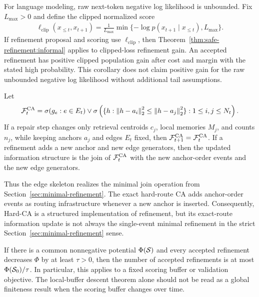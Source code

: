 \begin{corollary}
\label{cor:lm-clipped-refinement:informal}
For language modeling, raw next-token negative log likelihood is unbounded. Fix $L_{\max}>0$ and define the clipped normalized score
\begin{align*}
\ell_{\mathrm{clip}}(x_{\le t},x_{t+1})
=
\frac{1}{L_{\max}}
\min\{-\log p(x_{t+1}\mid x_{\le t}),L_{\max}\}.
\end{align*}
If refinement proposal and scoring use $\ell_{\mathrm{clip}}$, then Theorem~\ref{thm:safe-refinement:informal} applies to clipped-loss refinement gain. An accepted refinement has positive clipped population gain after cost and margin with the stated high probability. This corollary does not claim positive gain for the raw unbounded negative log likelihood without additional tail assumptions.
\end{corollary}

\begin{theorem}
\label{thm:anchor-stable:informal}
Let
\begin{align*}
\mathcal{F}_t^{\mathrm{CA}}
=
\sigma(g_e:e\in E_t)
\vee
\sigma\left(\{h:\left\lVert h-a_i\right\rVert_2^2\le \left\lVert h-a_j\right\rVert_2^2\}:1\le i,j\le N_t\right).
\end{align*}
If a repair step changes only retrieval centroids $c_j$, local memories $M_j$, and counts $n_j$, while keeping anchors $a_j$ and edges $E_t$ fixed, then $\mathcal{F}_{t+1}^{\mathrm{CA}}=\mathcal{F}_t^{\mathrm{CA}}$. If a refinement adds a new anchor and new edge generators, then the updated information structure is the join of $\mathcal{F}_t^{\mathrm{CA}}$ with the new anchor-order events and the new edge generators.
\end{theorem}

Thus the edge skeleton realizes the minimal join operation from Section~\ref{sec:minimal-refinement}. The exact hard-route CA adds anchor-order events as routing infrastructure whenever a new anchor is inserted. Consequently, Hard-CA is a structured implementation of refinement, but its exact-route information update is not always the single-event minimal refinement in the strict Section~\ref{sec:minimal-refinement} sense.

\begin{corollary}
\label{cor:finite-refinements:informal}
If there is a common nonnegative potential $\Phi(\mathcal{S})$ and every accepted refinement decreases $\Phi$ by at least $\tau>0$, then the number of accepted refinements is at most $\Phi(\mathcal{S}_0)/\tau$. In particular, this applies to a fixed scoring buffer or validation objective. The local-buffer descent theorem alone should not be read as a global finiteness result when the scoring buffer changes over time.
\end{corollary}

